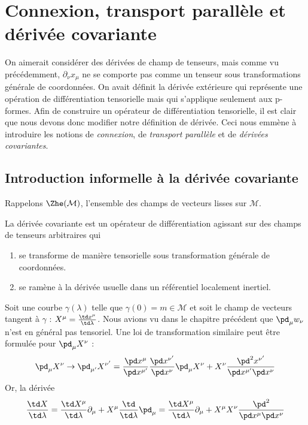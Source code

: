 \section{Connexion, transport parallèle et dérivée covariante}
On aimerait considérer des dérivées de champ de tenseurs, mais comme vu précédemment, $\partial_{\nu}x_{\mu}$ ne se comporte pas comme un tenseur sous transformations générale de coordonnées. On avait définit la dérivée extérieure qui représente une opération de différentiation tensorielle mais qui s'applique seulement aux p-formes. Afin de construire un opérateur de différentiation tensorielle, il est clair que nous devons donc modifier notre définition de dérivée. Ceci nous emmène à introduire les notions de \emph{connexion}, de \emph{transport parallèle} et de \emph{dérivées covariantes}.
\subsection{Introduction informelle à la dérivée covariante}
Rappelons $\Zhe(\mathcal{M})$, l'ensemble des champs de vecteurs lisses sur $\mathcal{M}$.
\begin{theoremframe}
    \begin{defi}
    \label{def:covariant der}
        La dérivée covariante est un opérateur de différentiation agissant sur des champs de tenseurs arbitraires qui 
        \begin{enumerate}[label=(\roman*)]
            \item se transforme de manière tensorielle sous transformation générale de coordonnées.
            \item se ramène à la dérivée usuelle dans un référentiel localement inertiel. 
        \end{enumerate}
    \end{defi}
\end{theoremframe}
Soit une courbe $\gamma(\lambda)$ telle que $\gamma(0)=m \in \mathcal{M}$ et soit le champ de vecteurs tangent à $\gamma$ : $X^\mu = \frac{\td x^\mu}{\td \lambda}$. Nous avions vu dans le chapitre précédent que $\pd_\mu w_\nu$ n'est en général pas tensoriel. Une loi de transformation similaire peut être formulée pour $\pd_\mu X^\nu$ :
\begin{equation}
    \pd_\mu X^\nu \to \pd_{\mu'} X^{\nu'} = \frac{\pd x^\mu}{\pd x^{\mu'}} \frac{\pd x^{\nu'}}{\pd x^{\nu}} \pd_\mu X^\nu + X^\nu  \frac{\pd^2 x^{\nu'}}{\pd x^{\mu'}\pd x^{\nu}}
\end{equation}
Or, la dérivée
\begin{equation}
    \frac{\td X}{\td \lambda} = \frac{\td X^\mu}{\td \lambda} \partial_\mu + X^\mu \frac{\td}{\td  \lambda} \pd_\mu = \frac{\td X^\mu}{\td \lambda} \partial_\mu + X^\mu X^\nu\frac{\pd^2}{\pd x^\mu \pd x^\nu}
\end{equation}
